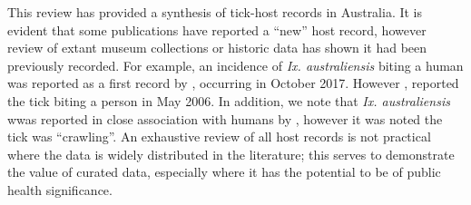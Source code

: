 \documentclass[a4paper, nobind]{templates/ociamthesis}
\begin{document}
This review has provided a synthesis of tick-host records in Australia.
It is evident that some publications have reported a ``new'' host record, however review of extant museum collections or historic data has shown it had been previously recorded.
For example, an incidence of \emph{Ix. australiensis} biting a human was reported as a first record by \textcite{kwakFirstRecordsHuman2018}, occurring in October 2017.
However \textcite{rabyNewFociSpotted2016}, reported the tick biting a person in May 2006.
In addition, we note that \emph{Ix. australiensis} wwas reported in close association with humans by \textcite{robertsAustralianTicks1970}, however it was noted the tick was ``crawling''. An exhaustive review of all host records is not practical where the data is widely distributed in the literature; this serves to demonstrate the value of curated data, especially where it has the potential to be of public health significance.
\end{document}

